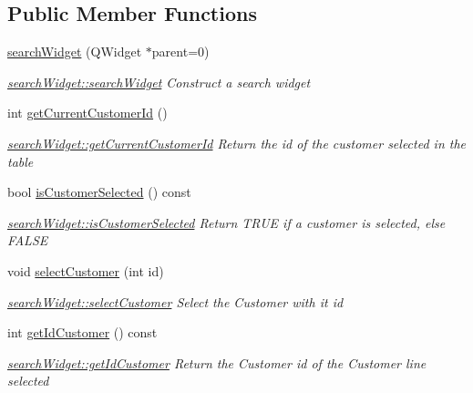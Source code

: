\subsection*{Public Member Functions}
\begin{DoxyCompactItemize}
\item 
\hyperlink{classGui_1_1Widgets_1_1searchWidget_a8d77bcf326543f841d1c05fe9819183f}{search\-Widget} (Q\-Widget $\ast$parent=0)
\begin{DoxyCompactList}\small\item\em \hyperlink{classGui_1_1Widgets_1_1searchWidget_a8d77bcf326543f841d1c05fe9819183f}{search\-Widget\-::search\-Widget} Construct a search widget \end{DoxyCompactList}\item 
int \hyperlink{classGui_1_1Widgets_1_1searchWidget_a93c6519cc7e0d8f440451d14fb85bd31}{get\-Current\-Customer\-Id} ()
\begin{DoxyCompactList}\small\item\em \hyperlink{classGui_1_1Widgets_1_1searchWidget_a93c6519cc7e0d8f440451d14fb85bd31}{search\-Widget\-::get\-Current\-Customer\-Id} Return the id of the customer selected in the table \end{DoxyCompactList}\item 
bool \hyperlink{classGui_1_1Widgets_1_1searchWidget_a3cb27e088874c5b8c548d0346a5d85f2}{is\-Customer\-Selected} () const 
\begin{DoxyCompactList}\small\item\em \hyperlink{classGui_1_1Widgets_1_1searchWidget_a3cb27e088874c5b8c548d0346a5d85f2}{search\-Widget\-::is\-Customer\-Selected} Return T\-R\-U\-E if a customer is selected, else F\-A\-L\-S\-E \end{DoxyCompactList}\item 
void \hyperlink{classGui_1_1Widgets_1_1searchWidget_a96ba18927785257377dcd3701d41e8d1}{select\-Customer} (int id)
\begin{DoxyCompactList}\small\item\em \hyperlink{classGui_1_1Widgets_1_1searchWidget_a96ba18927785257377dcd3701d41e8d1}{search\-Widget\-::select\-Customer} Select the Customer with it {\itshape id} \end{DoxyCompactList}\item 
int \hyperlink{classGui_1_1Widgets_1_1searchWidget_a20de80dbfa207b4ecc8b12433fcebb4b}{get\-Id\-Customer} () const 
\begin{DoxyCompactList}\small\item\em \hyperlink{classGui_1_1Widgets_1_1searchWidget_a20de80dbfa207b4ecc8b12433fcebb4b}{search\-Widget\-::get\-Id\-Customer} Return the Customer id of the Customer line selected \end{DoxyCompactList}\item 

\end{DoxyCompactItemize}
